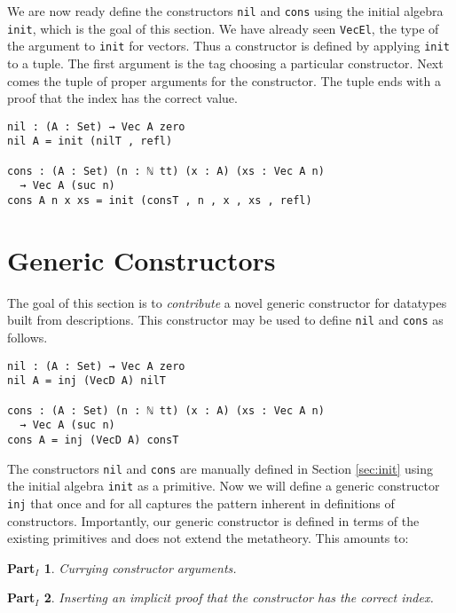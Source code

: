 \documentclass[preprint,nonatbib]{sigplanconf}
\newtheorem{myparti}{Part$_I$}
\newcommand{\refsec}[1]{Section \ref{sec:#1}}
\begin{document}
We are now ready define the constructors {\tt nil} and
{\tt cons} using the initial algebra {\tt init}, which is the goal of
this section.
We have already seen
{\tt VecEl}, the type of the argument to {\tt init} for vectors.
Thus a constructor is defined by applying {\tt init} to a tuple. The
first argument is the tag choosing a particular constructor. Next comes
the tuple of proper arguments for the constructor. The tuple
ends with a proof that the index has the correct value.

\begin{verbatim}
nil : (A : Set) → Vec A zero
nil A = init (nilT , refl)

cons : (A : Set) (n : ℕ tt) (x : A) (xs : Vec A n)
  → Vec A (suc n)
cons A n x xs = init (consT , n , x , xs , refl)
\end{verbatim}

\section{Generic Constructors}
\label{sec:inj}

The goal of this section is to {\it contribute} a novel generic
constructor for datatypes built from descriptions. This constructor
may be used to define {\tt nil} and {\tt cons} as follows.

\begin{verbatim}
nil : (A : Set) → Vec A zero
nil A = inj (VecD A) nilT

cons : (A : Set) (n : ℕ tt) (x : A) (xs : Vec A n)
  → Vec A (suc n)
cons A = inj (VecD A) consT
\end{verbatim}

The constructors {\tt nil} and {\tt cons} are manually
defined in \refsec{init} using the initial algebra
{\tt init} as a primitive. Now we will define a generic constructor
{\tt inj} that once and for all captures the pattern inherent in
definitions of constructors. Importantly, our generic constructor is
defined in terms of the existing primitives and does not extend the
metatheory.
This amounts to:

\begin{myparti}
\label{parti:one}
Currying constructor arguments.
\end{myparti}

\begin{myparti}
\label{parti:two}
Inserting an implicit proof that the constructor has the correct index.
\end{myparti}
\end{document}
